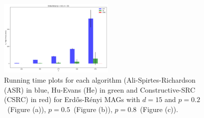 \documentclass[a4paper]{article}
\begin{document}
\begin{figure}[htbp]
	\centering
	\hfill
	
	\includegraphics[width=0.49\textwidth]{figures/Figure_12.png}
	
	\caption{Running time plots for each algorithm (Ali-Spirtes-Richardson (ASR) in blue, Hu-Evans (He) in green and Constructive-SRC (CSRC) in red) for Erd\H{o}s-R\'{e}nyi MAGs with $d=15$ and $p=0.2$~(Figure (a)), $p=0.5$~(Figure (b)), $p=0.8$~(Figure (c)).}
	\label{fig:er-15-ap}
\end{figure}
\end{document}
